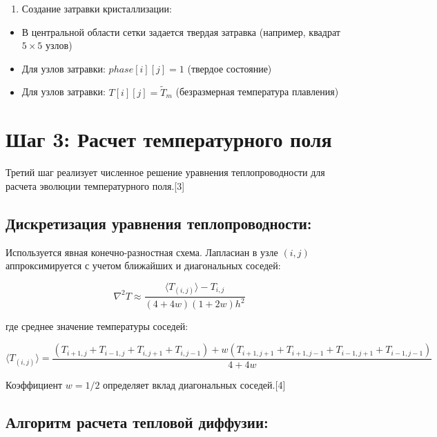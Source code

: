 \documentclass[
  12pt,
  a4paper,
  DIV=11,
  numbers=noendperiod]{scrreprt}
\providecommand{\tightlist}{%
  \setlength{\itemsep}{0pt}\setlength{\parskip}{0pt}}\usepackage{longtable,booktabs,array}
\begin{document}
\begin{enumerate}
\def\labelenumi{\arabic{enumi}.}
\setcounter{enumi}{1}
\tightlist
\item
  Создание затравки кристаллизации:
\end{enumerate}

\begin{itemize}
\tightlist
\item
  В центральной области сетки задается твердая затравка (например,
  квадрат \(5 \times 5\) узлов)
\item
  Для узлов затравки: \(phase[i][j] = 1\) (твердое состояние)
\item
  Для узлов затравки: \(T[i][j] = \tilde{T}_m\) (безразмерная
  температура плавления)
\end{itemize}

\section{Шаг 3: Расчет температурного
поля}\label{ux448ux430ux433-3-ux440ux430ux441ux447ux435ux442-ux442ux435ux43cux43fux435ux440ux430ux442ux443ux440ux43dux43eux433ux43e-ux43fux43eux43bux44f}

Третий шаг реализует численное решение уравнения теплопроводности для
расчета эволюции температурного поля.{[}3{]}

\subsection{Дискретизация уравнения
теплопроводности:}\label{ux434ux438ux441ux43aux440ux435ux442ux438ux437ux430ux446ux438ux44f-ux443ux440ux430ux432ux43dux435ux43dux438ux44f-ux442ux435ux43fux43bux43eux43fux440ux43eux432ux43eux434ux43dux43eux441ux442ux438}

Используется явная конечно-разностная схема. Лапласиан в узле \((i,j)\)
аппроксимируется с учетом ближайших и диагональных соседей:

\[
\nabla^2 T \approx \frac{\langle T_{(i,j)} \rangle - T_{i,j}}{(4 + 4w)(1 + 2w)h^2}
\]

где среднее значение температуры соседей:

\[
\langle T_{(i,j)} \rangle = \frac{ (T_{i+1,j} + T_{i-1,j} + T_{i,j+1} + T_{i,j-1}) + w (T_{i+1,j+1} + T_{i+1,j-1} + T_{i-1,j+1} + T_{i-1,j-1}) }{4 + 4w}
\]

Коэффициент \(w = 1/2\) определяет вклад диагональных соседей.{[}4{]}

\subsection{Алгоритм расчета тепловой
диффузии:}\label{ux430ux43bux433ux43eux440ux438ux442ux43c-ux440ux430ux441ux447ux435ux442ux430-ux442ux435ux43fux43bux43eux432ux43eux439-ux434ux438ux444ux444ux443ux437ux438ux438}
\end{document}
